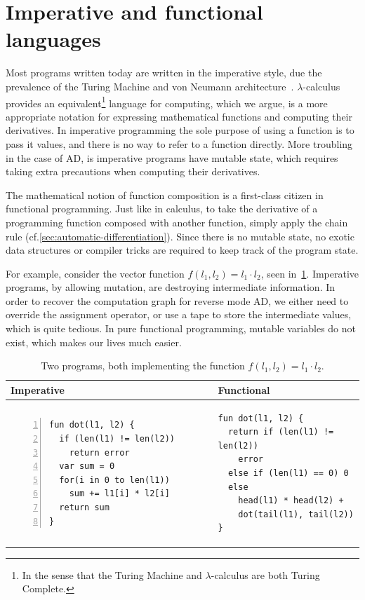 \documentclass[12pt,initial,twoside,maitrise]{dms}
\numberwithin{equation}{section}
\numberwithin{table}{chapter}
\numberwithin{figure}{chapter}
\begin{document}
\section{Imperative and functional languages}

Most programs written today are written in the imperative style, due the prevalence of the Turing Machine and von Neumann architecture~\citep{backus2007can}. $\lambda$-calculus provides an equivalent\footnote{In the sense that the Turing Machine and $\lambda$-calculus are both Turing Complete.} language for computing, which we argue, is a more appropriate notation for expressing mathematical functions and computing their derivatives. In imperative programming the sole purpose of using a function is to pass it values, and there is no way to refer to a function directly. More troubling in the case of AD, is imperative programs have mutable state, which requires taking extra precautions when computing their derivatives.

The mathematical notion of function composition is a first-class citizen in functional programming. Just like in calculus, to take the derivative of a programming function composed with another function, simply apply the chain rule (cf.\ref{sec:automatic-differentiation}). Since there is no mutable state, no exotic data structures or compiler tricks are required to keep track of the program state.

For example, consider the vector function $f(l_1, l_2) = l_1 \cdot l_2$, seen in~\ref{tab:1}. Imperative programs, by allowing mutation, are destroying intermediate information. In order to recover the computation graph for reverse mode AD, we either need to override the assignment operator, or use a tape to store the intermediate values, which is quite tedious. In pure functional programming, mutable variables do not exist, which makes our lives much easier.

\begin{table}[t]
    \centering
    \begin{tabular}{|l|l|}
        \hline
        Imperative & Functional \\
        \hline
        {\begin{lstlisting}[style=barelisting, linewidth=5.5cm, numbers=left]
fun dot(l1, l2) {
  if (len(l1) != len(l2))
    return error
  var sum = 0
  for(i in 0 to len(l1))
    sum += l1[i] * l2[i]
  return sum
}
        \end{lstlisting}}
         &
        {\begin{lstlisting}[style=barelisting, linewidth=5.5cm, numbers=none]
fun dot(l1, l2) {
  return if (len(l1) != len(l2))
    error
  else if (len(l1) == 0) 0
  else
    head(l1) * head(l2) +
    dot(tail(l1), tail(l2))
}
        \end{lstlisting}}
        \\
        \hline
    \end{tabular}
    \caption{Two programs, both implementing the function $f(l_1, l_2) = l_1 \cdot l_2$.}
    \label{tab:1}
\end{table}
\end{document}
